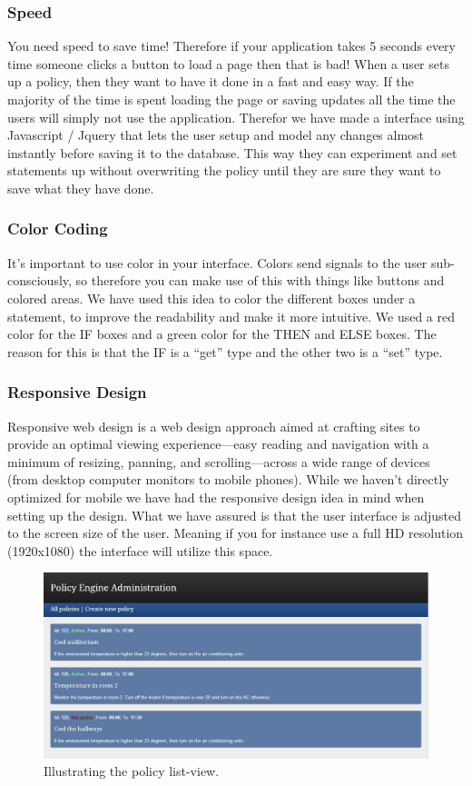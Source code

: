 \subsubsection{Speed}
You need speed to save time! Therefore if your application takes 5 seconds every time someone clicks a button to load a page then that is bad! When a user sets up a policy, then they want to have it done in a fast and easy way. If the majority of the time is spent loading the page or saving updates all the time the users will simply not use the application. Therefor we have made a interface using Javascript / Jquery that lets the user setup and model any changes almost instantly before saving it to the database. This way they can experiment and set statements up without overwriting the policy until they are sure they want to save what they have done.

\subsubsection{Color Coding}
It's important to use color in your interface. Colors send signals to the user sub-consciously, so therefore you can make use of this with things like buttons and colored areas. We have used this idea to color the different boxes under a statement, to improve the readability and make it more intuitive. We used a red color for the IF boxes and a green color for the THEN and ELSE boxes. The reason for this is that the IF is a "`get"' type and the other two is a "`set"' type.

\subsubsection{Responsive Design}
Responsive web design is a web design approach aimed at crafting sites to provide an optimal viewing experience—easy reading and navigation with a minimum of resizing, panning, and scrolling—across a wide range of devices (from desktop computer monitors to mobile phones). While we haven't directly optimized for mobile we have had the responsive design idea in mind when setting up the design. What we have assured is that the user interface is adjusted to the screen size of the user. Meaning if you for instance use a full HD resolution (1920x1080) the interface will utilize this space.

\begin{figure}[ht]
\centering
\includegraphics[width=\columnwidth]{policylist.png}
\caption{Illustrating the policy list-view.}
\label{fig:policylist}
\end{figure}

